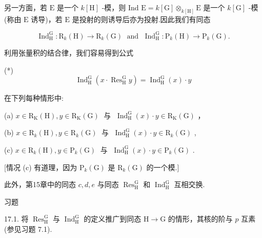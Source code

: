 \documentclass[10pt]{article}
\begin{document}
另一方面，若 \(\mathrm{E}\) 是一个 \(k\left\lbrack  \mathrm{H}\right\rbrack\) -模，则 Ind \(\mathrm{E} = k\left\lbrack  \mathrm{G}\right\rbrack  { \otimes  }_{k\left\lbrack  \mathrm{H}\right\rbrack  }\mathrm{E}\) 是一个 \(k\left\lbrack  \mathrm{G}\right\rbrack\) -模(称由 \(\mathrm{E}\) 诱导)，若 \(\mathrm{E}\) 是投射的则诱导后亦为投射.因此我们有同态

\[
{\operatorname{Ind}}_{\mathrm{H}}^{\mathrm{G}} : {\mathrm{R}}_{k}\left( \mathrm{H}\right)  \rightarrow  {\mathrm{R}}_{k}\left( \mathrm{G}\right) \;\text{ and }\;{\operatorname{Ind}}_{\mathrm{H}}^{\mathrm{G}} : {\mathrm{P}}_{k}\left( \mathrm{H}\right)  \rightarrow  {\mathrm{P}}_{k}\left( \mathrm{G}\right) .
\]

利用张量积的结合律，我们容易得到公式

(*)
\[
{\operatorname{Ind}}_{\mathrm{H}}^{\mathrm{G}}\left( {x \cdot  {\operatorname{Res}}_{\mathrm{H}}^{\mathrm{G}}y}\right)  = {\operatorname{Ind}}_{\mathrm{H}}^{\mathrm{G}}\left( x\right)  \cdot  y
\]

在下列每种情形中:

(a) \(x \in  {\mathrm{R}}_{\mathrm{K}}\left( \mathrm{H}\right) ,y \in  {\mathrm{R}}_{\mathrm{K}}\left( \mathrm{G}\right) \;\) 与 \(\;{\operatorname{Ind}}_{\mathrm{H}}^{\mathrm{G}}\left( x\right)  \cdot  y \in  {\mathrm{R}}_{\mathrm{K}}\left( \mathrm{G}\right)\) ，

(b) \(x \in  {\mathrm{R}}_{k}\left( \mathrm{H}\right) ,y \in  {\mathrm{R}}_{k}\left( \mathrm{G}\right) \;\) 与 \(\;{\operatorname{Ind}}_{\mathrm{H}}^{\mathrm{G}}\left( x\right)  \cdot  y \in  {\mathrm{R}}_{k}\left( \mathrm{G}\right)\) ,

(c) \(x \in  {\mathrm{R}}_{k}\left( \mathrm{H}\right) ,y \in  {\mathrm{P}}_{k}\left( \mathrm{G}\right) \;\) 与 \(\;{\operatorname{Ind}}_{\mathrm{H}}^{\mathrm{G}}\left( x\right)  \cdot  y \in  {\mathrm{P}}_{k}\left( \mathrm{G}\right)\) .

[情况 (c) 有道理，因为 \({\mathrm{P}}_{k}\left( \mathrm{G}\right)\) 是 \({\mathrm{R}}_{k}\left( \mathrm{G}\right)\) 的一个模.]

此外，第15章中的同态 \(c,d,e\) 与同态 \({\operatorname{Res}}_{\mathrm{H}}^{\mathrm{G}}\) 和 \({\operatorname{Ind}}_{\mathrm{H}}^{\mathrm{G}}\) 互相交换.

习题

17.1. 将 \({\operatorname{Res}}_{\mathrm{H}}^{\mathrm{G}}\) 与 \({\operatorname{Ind}}_{\mathrm{H}}^{\mathrm{G}}\) 的定义推广到同态 \(\mathrm{H} \rightarrow  \mathrm{G}\) 的情形，其核的阶与 \(p\) 互素(参见习题 7.1).
\end{document}
